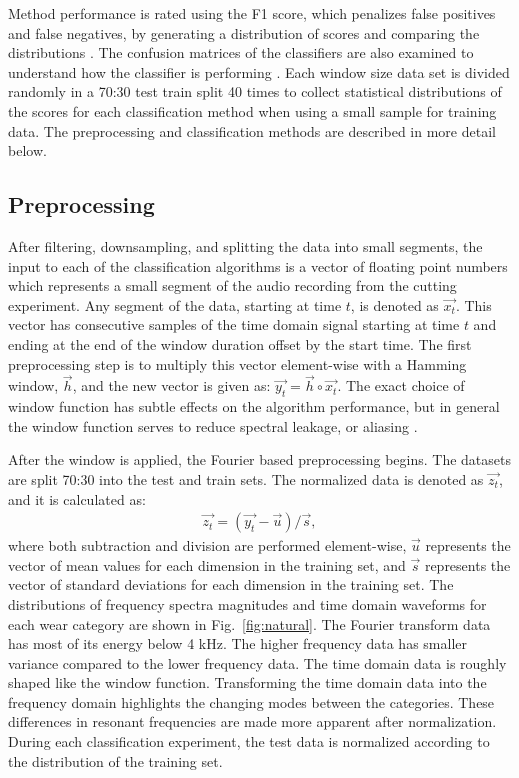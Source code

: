 Method performance is rated using the F1 score, which penalizes false positives and false negatives,
by generating a distribution of scores and comparing the distributions \cite{Goutte2005}.
The confusion matrices of the classifiers are also examined to understand 
how the classifier is performing \cite{Bramer2007}.
Each window size data set is divided randomly in a 70:30 test train split 40 times 
to collect statistical distributions of the scores for each classification method 
when using a small sample for training data.
The preprocessing and classification methods are described in more detail below.

\subsection{Preprocessing}

After filtering, downsampling, and splitting the data into small segments,
the input to each of the classification algorithms is a vector of floating point numbers 
which represents a small segment of the audio recording from the cutting experiment. 
Any segment of the data, starting at time $t$, is denoted as $\vec{x_t}$.
This vector has consecutive samples of the time domain signal starting at time $t$ and 
ending at the end of the window duration offset by the start time.
The first preprocessing step is to multiply this vector element-wise with a Hamming window, $\vec{h}$, and
the new vector is given as: $\vec{y_t} = \vec{h} \circ \vec{x_t}$.
The exact choice of window function has subtle effects on the algorithm performance, 
but in general the window function serves to reduce spectral leakage, or aliasing \cite{Harris1978}. 

After the window is applied, the Fourier based preprocessing begins.
The datasets are split 70:30 into the test and train sets. 
The normalized data is denoted as $\vec{z_t}$, and it is calculated as:
\begin{align}
\vec{z_t} = (\vec{y_t} - \vec{u}) / \vec{s},
\end{align}
where both subtraction and division are performed element-wise, $\vec{u}$ represents the vector
of mean values for each dimension in the training set, 
and $\vec{s}$ represents the vector of standard deviations for each
dimension in the training set. 
The distributions of frequency spectra magnitudes and time domain waveforms
for each wear category are shown in Fig.~\ref{fig:natural}.
The Fourier transform data has most of its energy below 4 kHz.
The higher frequency data has smaller variance compared to the
lower frequency data.
The time domain data is roughly shaped like the window function.
Transforming the time domain data into the frequency domain highlights
the changing modes between the categories.
These differences in resonant frequencies are made more apparent after normalization.
During each classification experiment, 
the test data is normalized according to the distribution of the training set.

